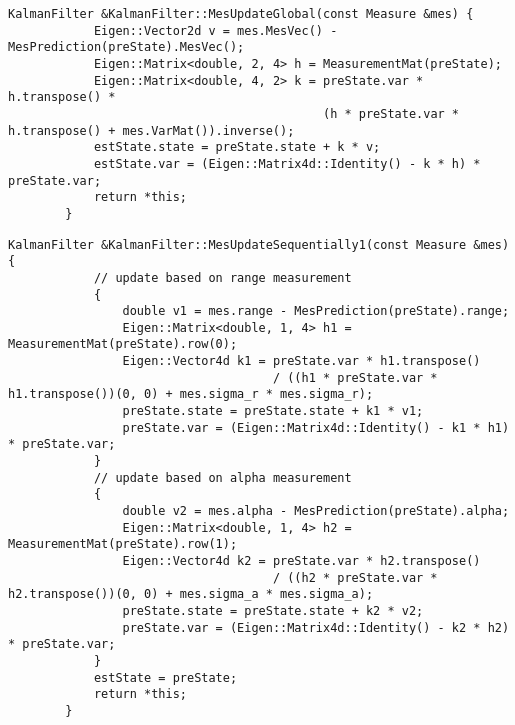 \documentclass[12pt, onecolumn]{article}
\newcommand\normf{\fangsong}
\begin{document}
	\begin{lstlisting}[caption={\normf “全局量测更新”算法实现}]
	    KalmanFilter &KalmanFilter::MesUpdateGlobal(const Measure &mes) {
	        Eigen::Vector2d v = mes.MesVec() - MesPrediction(preState).MesVec();
	        Eigen::Matrix<double, 2, 4> h = MeasurementMat(preState);
	        Eigen::Matrix<double, 4, 2> k = preState.var * h.transpose() *
	                                        (h * preState.var * h.transpose() + mes.VarMat()).inverse();
	        estState.state = preState.state + k * v;
	        estState.var = (Eigen::Matrix4d::Identity() - k * h) * preState.var;
	        return *this;
	    }
	\end{lstlisting}
		
	\begin{lstlisting}[caption={\normf “逐次量测更新(先距离后角度)”算法实现}]
	    KalmanFilter &KalmanFilter::MesUpdateSequentially1(const Measure &mes) {
	        // update based on range measurement
	        {
	            double v1 = mes.range - MesPrediction(preState).range;
	            Eigen::Matrix<double, 1, 4> h1 = MeasurementMat(preState).row(0);
	            Eigen::Vector4d k1 = preState.var * h1.transpose()
	                                 / ((h1 * preState.var * h1.transpose())(0, 0) + mes.sigma_r * mes.sigma_r);
	            preState.state = preState.state + k1 * v1;
	            preState.var = (Eigen::Matrix4d::Identity() - k1 * h1) * preState.var;
	        }
	        // update based on alpha measurement
	        {
	            double v2 = mes.alpha - MesPrediction(preState).alpha;
	            Eigen::Matrix<double, 1, 4> h2 = MeasurementMat(preState).row(1);
	            Eigen::Vector4d k2 = preState.var * h2.transpose()
	                                 / ((h2 * preState.var * h2.transpose())(0, 0) + mes.sigma_a * mes.sigma_a);
	            preState.state = preState.state + k2 * v2;
	            preState.var = (Eigen::Matrix4d::Identity() - k2 * h2) * preState.var;
	        }
	        estState = preState;
	        return *this;
	    }
	\end{lstlisting}
	
\end{document}
